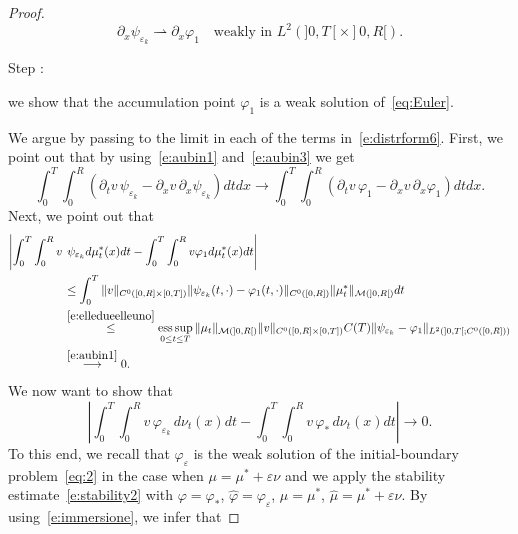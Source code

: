 \documentclass[11pt,leqno]{amsart}
\newcounter{stepnb}
\numberwithin{equation}{section}
\begin{document}
\begin{proof}
\begin{equation}
\label{e:aubin3}
{\partial_x } \psi_{{\varepsilon}_k}  {\rightharpoonup} 
       {\partial_x } {\varphi}_1 \quad 
       \text{weakly in $L^2 (]0, T[\times ]0, R[)$}.
\end{equation}
{{{\sc \addtocounter{stepnb}{1}\noindent  Step :} {we show that the accumulation point ${\varphi}_1$ is a weak solution of~\eqref{eq:Euler}}.}} We argue by passing to the limit in each of the terms in~\eqref{e:distrform6}. First, we point out that by using~\eqref{e:aubin1} and~\eqref{e:aubin3} we get 
\begin{equation}
\label{e:alimite1}
     \int_0^T \int_0^R( {\partial_t} v  \, \psi_{{\varepsilon}_k}
     - {\partial_x } v \, {\partial_x }  \psi_{{\varepsilon}_k} )dtdx\to 
     \int_0^T \int_0^R ({\partial_t} v \, {\varphi}_1
     - {\partial_x } v \,  {\partial_x }  {\varphi}_1  )dtdx.
\end{equation}
Next, we point out that 
\begin{equation}
  \label{e:alimite2}
  \begin{split}
    \left| \int_0^T \int_0^R v \right. & \left. \psi_{{\varepsilon}_k} d
      \mu^\ast_t (x) dt - \int_0^T \int_0^R v {\varphi}_1 d \mu^\ast_t (x)
      dt \right|
    \\
    & \leq \int_0^T \| v \|_{C^0 ([0, R] \times [0,
      T])} \| \psi_{{\varepsilon}_k} (t, \cdot) - {\varphi}_1(t, \cdot) \|_{C^0 ([0,
      R])}
    \| \mu_t^* \|_{\mathcal M (]0, R[)} dt 
    \\
    & \stackrel{\eqref{e:elledueelleuno}}{\leq} \operatorname*{ess\,sup}_{0\le t\le T}
    \| \mu_t \|_{\mathcal M (]0, R[)} \| v \|_{C^0 ([0, R] \times [0,
      T])} C(T) \| \psi_{{\varepsilon}_k}  - {\varphi}_1
    \|_{L^2 (]0, T[; C^0 ([0, R]))}
    \\
    & \stackrel{\eqref{e:aubin1}}{\longrightarrow} 0.
  \end{split}
\end{equation}
We now want to show that 
\begin{equation}
\label{e:alimite3}
     \left|  \int_0^T \! \! \int_0^R v  \, {\varphi}_{{\varepsilon}_k}  \, d \nu_t(x) dt -
      \int_0^T \! \! \int_0^R v  \, {\varphi}_\ast  \, d \nu_t(x) dt \right|
     \to 0.
\end{equation}
To this end, we recall that ${\varphi}_{\varepsilon}$ is the weak solution of the initial-boundary problem~\eqref{eq:2} in the case when $\mu = \mu^*+{\varepsilon}\nu$ and we apply the stability estimate~\eqref{e:stability2} with ${\varphi}= {\varphi}_\ast$, $\hat {\varphi} = {\varphi}_{\varepsilon}$, $\mu = \mu^\ast$, $\hat \mu = \mu^\ast + {\varepsilon} \nu$. By using~\eqref{e:immersione}, we infer that 

\end{proof}
\end{document}
